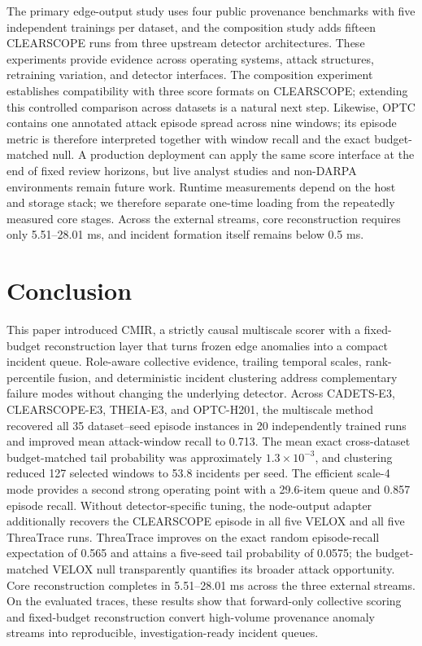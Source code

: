 \documentclass[lettersize,journal]{IEEEtran}
\newcommand{\method}{CMIR}
\begin{document}
The primary edge-output study uses four public provenance benchmarks with five
independent trainings per dataset, and the composition study adds fifteen
CLEARSCOPE runs from three upstream detector architectures.  These experiments
provide evidence across operating systems, attack structures, retraining
variation, and detector interfaces.  The composition experiment establishes
compatibility with three score formats on CLEARSCOPE; extending this controlled
comparison across datasets is a natural next step.  Likewise,
OPTC contains one annotated attack episode spread across nine windows; its
episode metric is therefore interpreted together with window recall and the
exact budget-matched null.  A production deployment can apply the same score
interface at the end of fixed review horizons, but live analyst studies and
non-DARPA environments remain future work.  Runtime measurements depend on the
host and storage stack;
we therefore separate one-time loading from the repeatedly measured core
stages.  Across the external streams, core reconstruction requires only
5.51--28.01 ms, and incident formation itself remains below 0.5 ms.

\section{Conclusion}
\label{sec:conclusion}

This paper introduced \method{}, a strictly causal multiscale scorer with a
fixed-budget reconstruction layer that turns
frozen edge anomalies into a compact incident queue.  Role-aware collective
evidence, trailing temporal scales, rank-percentile fusion, and deterministic
incident clustering address complementary failure modes without changing the
underlying detector.  Across CADETS-E3, CLEARSCOPE-E3, THEIA-E3, and OPTC-H201,
the multiscale method recovered all 35 dataset--seed episode instances in 20
independently trained runs and improved mean attack-window recall to 0.713.  The
mean exact cross-dataset budget-matched tail probability was approximately
$1.3\times10^{-3}$,
and clustering reduced 127 selected windows to 53.8 incidents per seed.  The
efficient scale-4 mode provides a second strong operating point with a 29.6-item
queue and 0.857 episode recall.  Without detector-specific tuning, the
node-output adapter additionally recovers the CLEARSCOPE episode in all five
VELOX and all five ThreaTrace runs.  ThreaTrace improves on the exact random
episode-recall expectation of 0.565 and attains a five-seed tail probability of
0.0575; the budget-matched VELOX null transparently quantifies its broader
attack opportunity.  Core reconstruction completes in 5.51--28.01 ms across
the three external streams.  On the evaluated traces, these results show that
forward-only collective scoring and fixed-budget reconstruction convert
high-volume provenance anomaly streams into reproducible,
investigation-ready incident queues.
\end{document}
